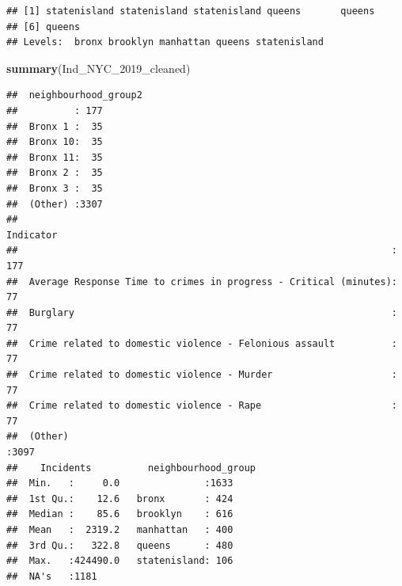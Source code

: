 \documentclass[]{article}
\newenvironment{Shaded}{\begin{snugshade}}{\end{snugshade}}
\newcommand{\DecValTok}[1]{\textcolor[rgb]{0.00,0.00,0.81}{#1}}
\newcommand{\KeywordTok}[1]{\textcolor[rgb]{0.13,0.29,0.53}{\textbf{#1}}}
\newcommand{\NormalTok}[1]{#1}
\newcommand{\OperatorTok}[1]{\textcolor[rgb]{0.81,0.36,0.00}{\textbf{#1}}}
\begin{document}
\begin{verbatim}
## [1] statenisland statenisland statenisland queens       queens      
## [6] queens      
## Levels:  bronx brooklyn manhattan queens statenisland
\end{verbatim}

\begin{Shaded}
\begin{Highlighting}[]
\KeywordTok{summary}\NormalTok{(Ind_NYC_}\DecValTok{2019}\NormalTok{_cleaned)}
\end{Highlighting}
\end{Shaded}

\begin{verbatim}
##  neighbourhood_group2
##          : 177       
##  Bronx 1 :  35       
##  Bronx 10:  35       
##  Bronx 11:  35       
##  Bronx 2 :  35       
##  Bronx 3 :  35       
##  (Other) :3307       
##                                                             Indicator   
##                                                                  : 177  
##  Average Response Time to crimes in progress - Critical (minutes):  77  
##  Burglary                                                        :  77  
##  Crime related to domestic violence - Felonious assault          :  77  
##  Crime related to domestic violence - Murder                     :  77  
##  Crime related to domestic violence - Rape                       :  77  
##  (Other)                                                         :3097  
##    Incidents          neighbourhood_group
##  Min.   :     0.0               :1633    
##  1st Qu.:    12.6   bronx       : 424    
##  Median :    85.6   brooklyn    : 616    
##  Mean   :  2319.2   manhattan   : 400    
##  3rd Qu.:   322.8   queens      : 480    
##  Max.   :424490.0   statenisland: 106    
##  NA's   :1181
\end{verbatim}

\begin{Shaded}
\end{Shaded}
\end{document}
